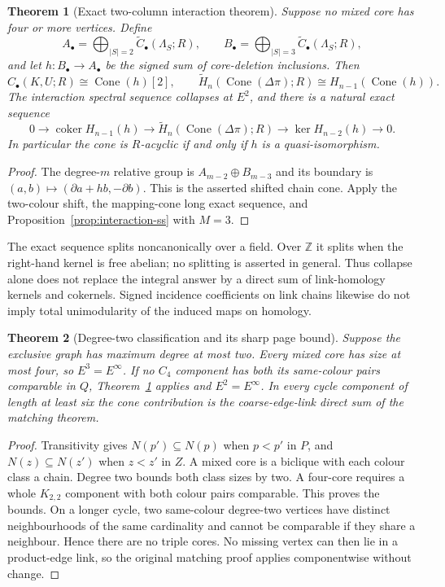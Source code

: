 \documentclass[11pt]{article}
\newtheorem{theorem}{Theorem}[section]
\begin{document}
\begin{theorem}[Exact two-column interaction theorem]
\label{thm:two-column-interaction}
Suppose no mixed core has four or more vertices.  Define
\[
 A_\bullet=\bigoplus_{|S|=2}\widetilde C_\bullet(\Lambda_S;R),
 \qquad
 B_\bullet=\bigoplus_{|S|=3}\widetilde C_\bullet(\Lambda_S;R),
\]
and let $h:B_\bullet\to A_\bullet$ be the signed sum of core-deletion
inclusions.  Then
\[
 C_\bullet(K,U;R)\cong\operatorname{Cone}(h)[2],\qquad
 \widetilde H_n(\operatorname{Cone}(\Delta\pi);R)
 \cong H_{n-1}(\operatorname{Cone}(h)).
\]
The interaction spectral sequence collapses at $E^2$, and there is a
natural exact sequence
\[
 0\longrightarrow\operatorname{coker}H_{n-1}(h)
 \longrightarrow\widetilde H_n(\operatorname{Cone}(\Delta\pi);R)
 \longrightarrow\ker H_{n-2}(h)\longrightarrow0.
\]
In particular the cone is $R$-acyclic if and only if $h$ is a
quasi-isomorphism.
\end{theorem}
\begin{proof}
The degree-$m$ relative group is $A_{m-2}\oplus B_{m-3}$ and its
boundary is $(a,b)\mapsto(\partial a+hb,-\partial b)$.
This is the asserted shifted chain cone.  Apply the two-colour shift,
the mapping-cone long exact sequence, and
Proposition~\ref{prop:interaction-ss} with $M=3$.
\end{proof}

The exact sequence splits noncanonically over a field.  Over $\mathbb Z$
it splits when the right-hand kernel is free abelian; no splitting is
asserted in general.  Thus collapse alone does not replace the integral
answer by a direct sum of link-homology kernels and cokernels.  Signed
incidence coefficients on link chains likewise do not imply total
unimodularity of the induced maps on homology.

\begin{theorem}[Degree-two classification and its sharp page bound]
\label{thm:degree-two-interaction}
Suppose the exclusive graph has maximum degree at most two.
Every mixed core has size at most four, so $E^3=E^\infty$.
If no $C_4$ component has both its same-colour pairs comparable in $Q$,
Theorem~\ref{thm:two-column-interaction} applies and $E^2=E^\infty$.
In every cycle component of length at least six the cone contribution is
the coarse-edge-link direct sum of the matching theorem.
\end{theorem}
\begin{proof}
Transitivity gives $N(p')\subseteq N(p)$ when $p<p'$ in $P$, and
$N(z)\subseteq N(z')$ when $z<z'$ in $Z$.
A mixed core is a biclique with each colour class a chain.  Degree two
bounds both class sizes by two.  A four-core requires a whole $K_{2,2}$
component with both colour pairs comparable.  This proves the bounds.
On a longer cycle, two same-colour degree-two vertices have distinct
neighbourhoods of the same cardinality and cannot be comparable if they
share a neighbour.  Hence there are no triple cores.  No missing vertex
can then lie in a product-edge link, so the original matching proof
applies componentwise without change.
\end{proof}
\end{document}

